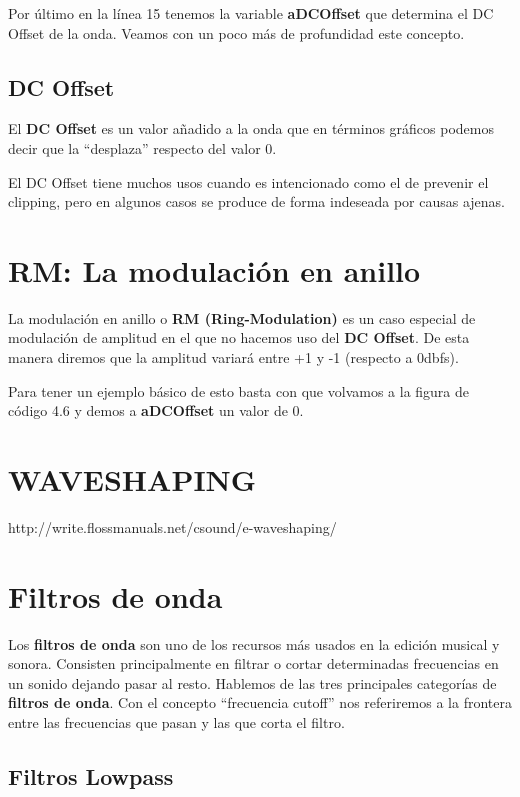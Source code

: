 Por último en la línea 15 tenemos la variable \textbf{aDCOffset} que determina el DC Offset de la onda. Veamos con un poco más de profundidad este concepto.

\subsection{DC Offset}
El \textbf{DC Offset} es un valor añadido a la onda que en términos gráficos podemos decir que la ``desplaza'' respecto del valor 0. 
 
El DC Offset tiene muchos usos cuando es intencionado como el de prevenir el clipping, pero en algunos casos se produce de forma indeseada por causas ajenas.
 
\section{RM: La modulación en anillo}

La modulación en anillo o \textbf{RM (Ring-Modulation)} es un caso especial de modulación de amplitud en el que no hacemos uso del \textbf{DC Offset}. De esta manera diremos que la amplitud variará entre +1 y -1 (respecto a 0dbfs).

Para tener un ejemplo básico de esto basta con que volvamos a la figura de código 4.6 y demos a \textbf{aDCOffset} un valor de 0.

\section{WAVESHAPING}
http://write.flossmanuals.net/csound/e-waveshaping/

\section{Filtros de onda}
Los \textbf{filtros de onda} son uno de los recursos más usados en la edición musical y sonora. Consisten principalmente en filtrar o cortar determinadas frecuencias en un sonido dejando pasar al resto. Hablemos de las tres principales categorías de \textbf{filtros de onda}.
Con el concepto ``frecuencia cutoff'' nos referiremos a la frontera entre las frecuencias que pasan y las que corta el filtro.

\subsection{Filtros Lowpass}

